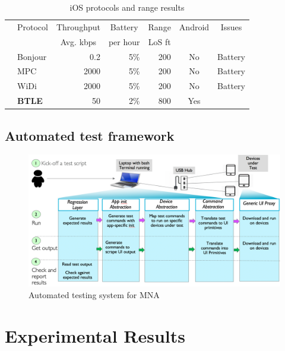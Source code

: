 \documentclass[conference]{IEEEtran}
\begin{document}
\begin{table}[H]
\caption{iOS protocols and range results}
\centering
\begin{tabular}{|c|l|r|r|r|c|l|}
\hline
& \multicolumn{1}{c|}{Protocol} & \multicolumn{1}{c|}{Throughput} & \multicolumn{1}{c|}{Battery} & \multicolumn{1}{c|}{Range} & \multicolumn{1}{c|}{Android} & \multicolumn{1}{c|}{Issues}\\
&                               & \multicolumn{1}{c|}{Avg. kbps}  & \multicolumn{1}{c|}{per hour} & \multicolumn{1}{c|}{LoS ft} &                  &                            \\
\hline
\parbox[t]{2mm}{} & Bonjour & 0.2 & 5\% & 200 & No & Battery\\
& MPC & 2000 & 5\% & 200 & No & Battery\\
& WiDi & 2000 & 5\% & 200 & No & Battery\\
\hline
& \textbf{BTLE} & 50 & 2\% & 800 & Yes & \\
\hline
\end{tabular}
\end{table}


%
\subsection{Automated test framework}
\label{sec:test}
%

\begin{figure}[htbp]
\centerline{\includegraphics[width=\columnwidth]{figs/test_arch}}
\caption{Automated testing system for MNA}
\label{fig:test_arch}
\end{figure}

%
\section{Experimental Results}
\label{sec:eval}
%
\end{document}
